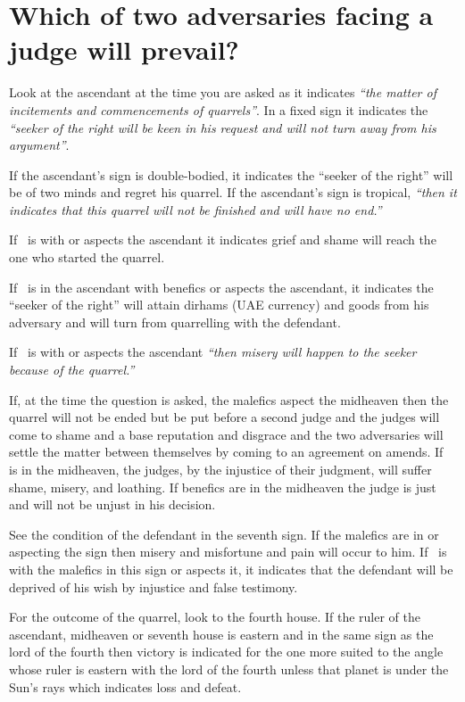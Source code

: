 \section{Which of two adversaries facing a judge will prevail?}
Look at the ascendant at the time you are asked as it indicates \textsl{``the matter of incitements and commencements of quarrels''}. In a fixed sign it indicates the \textsl{``seeker of the right will be keen in his request and will not turn away from his argument''}.

If the ascendant's sign is double-bodied, it indicates the ``seeker of the right'' will be of two minds and regret his quarrel. If the ascendant's sign is tropical, \textsl{``then it indicates that this quarrel will not be finished and will have no end.''}

If \Mars\, is with or aspects the ascendant it indicates grief and shame will reach the one who started the quarrel.

If \Mercury\, is in the ascendant with benefics or aspects the ascendant, it indicates the ``seeker of the right'' will attain dirhams (UAE currency) and goods from his adversary and will turn from quarrelling with the defendant.

If \Saturn\, is with or aspects the ascendant \textsl{``then misery will happen to the seeker because of the quarrel.''}

If, at the time the question is asked, the malefics aspect the midheaven then the quarrel will not be ended but be put before a second judge and the judges will come to shame and a base reputation and disgrace and the two adversaries will settle the matter between themselves by  coming to an agreement on amends. If \Saturn\, is in the midheaven, the judges, by the injustice of their judgment, will suffer shame, misery, and loathing. If benefics are in the midheaven the judge is just and will not be unjust in his decision.

See the condition of the defendant in the seventh sign. If the malefics are in or aspecting the sign then misery and misfortune and pain will occur to him. If \Mercury\, is with the malefics in this sign or aspects it, it indicates that the defendant will be deprived of his wish by injustice and false testimony.

For the outcome of the quarrel, look to the fourth house. If the ruler of the ascendant, midheaven or seventh house is eastern and in the same sign as the lord of the fourth then victory is indicated for the one more suited to the angle whose ruler is eastern with the lord of the fourth unless that planet is under the Sun's rays which indicates loss and defeat.

